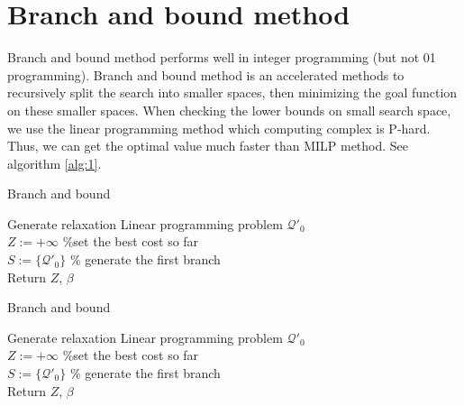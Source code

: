 \documentclass[10pt, Oct]{IEEEtran}
\begin{document}
\section{Branch and bound method}
Branch and bound method performs well in integer programming (but not 01 programming).
Branch and bound method is an accelerated methods to recursively split the search into smaller spaces, then minimizing the goal function on these smaller spaces. When checking the lower bounds on small search space, we use the linear programming method which computing complex is P-hard. Thus, we can get the optimal value much faster than MILP method. See algorithm \ref{alg:1}.


\begin{algorithm}
	\caption{Branch and bound}
	\label{alg:1}
	Generate relaxation Linear programming problem $\mathcal{Q}'_0$\\
	$Z:=+\infty$ \%{set} the best cost so far\\
	$S:=\{\mathcal{Q}'_0\}$  \% generate the first branch \\
	Return $Z$, $\beta$
\end{algorithm}

\begin{algorithm}
	\caption{Branch and bound}
	\label{alg:2}
	Generate relaxation Linear programming problem $\mathcal{Q}'_0$\\
	$Z:=+\infty$ \%{set} the best cost so far\\
	$S:=\{\mathcal{Q}'_0\}$  \% generate the first branch \\
   Return $Z$, $\beta$
\end{algorithm}
\end{document}
